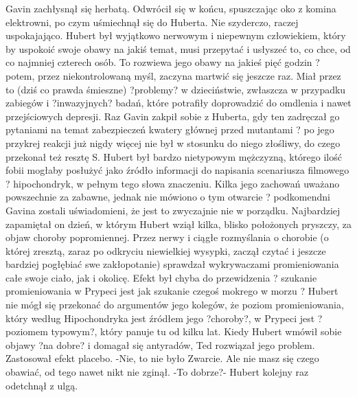 \documentclass[../MAIN.tex]{subfiles}
\begin{document}
Gavin zachłysnął się herbatą. Odwrócił się w końcu, spuszczając oko z komina elektrowni, po czym uśmiechnął się do Huberta. Nie szyderczo, raczej uspokajająco. Hubert był wyjątkowo nerwowym i niepewnym człowiekiem, który by uspokoić swoje obawy na jakiś temat, musi przepytać i usłyszeć to, co chce, od co najmniej czterech osób. To rozwiewa jego obawy na jakieś pięć godzin ? potem, przez niekontrolowaną myśl, zaczyna martwić się jeszcze raz. Miał przez to (dziś co prawda śmieszne) ?problemy? w dzieciństwie, zwłaszcza w przypadku zabiegów i ?inwazyjnych? badań, które potrafiły doprowadzić do omdlenia i nawet przejściowych depresji.
Raz Gavin zakpił sobie z Huberta, gdy ten zadręczał go pytaniami na temat zabezpieczeń kwatery głównej przed mutantami ? po jego przykrej reakcji już nigdy więcej nie był w stosunku do niego złośliwy, do czego przekonał też resztę S.
Hubert był bardzo nietypowym mężczyzną, którego ilość fobii mogłaby posłużyć jako źródło informacji do napisania scenariusza filmowego ? hipochondryk, w pełnym tego słowa znaczeniu. Kilka jego zachowań uważano powszechnie za zabawne, jednak nie mówiono o tym otwarcie ? podkomendni Gavina zostali uświadomieni, że jest to zwyczajnie nie w porządku.
Najbardziej zapamiętał on dzień, w którym Hubert wziął kilka, blisko położonych pryszczy, za objaw choroby popromiennej. Przez nerwy i ciągłe rozmyślania o chorobie (o której zresztą, zaraz po odkryciu niewielkiej wysypki, zaczął czytać i jeszcze bardziej pogłębiać swe zakłopotanie) sprawdzał wykrywaczami promieniowania całe swoje ciało, jak i okolicę. Efekt był chyba do przewidzenia ? szukanie promieniowania w Prypeci jest jak szukanie czegoś mokrego w morzu ? Hubert nie mógł się przekonać do argumentów jego kolegów, że poziom promieniowania, który według Hipochondryka jest źródłem jego ?choroby?, w Prypeci jest ?poziomem typowym?, który panuje tu od kilku lat.
Kiedy Hubert wmówił sobie objawy ?na dobre? i domagał się antyradów, Ted rozwiązał jego problem.
Zastosował efekt placebo.
-Nie, to nie było Zwarcie. Ale nie masz się czego obawiać, od tego nawet nikt nie zginął.
-To dobrze?- Hubert kolejny raz odetchnął z ulgą.
\end{document}
